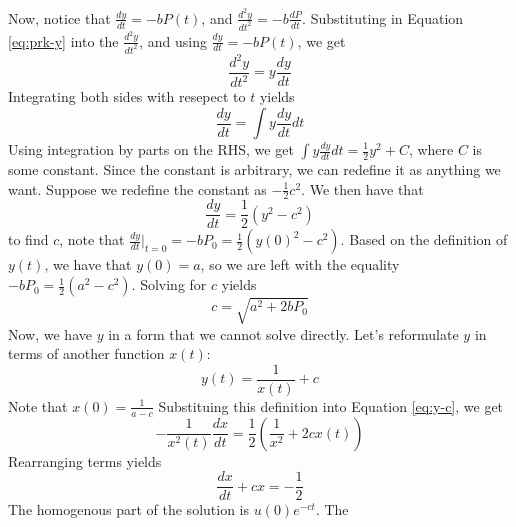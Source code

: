 \documentclass[11pt,addpoints,answers]{exam}
\begin{document}
\begin{questions}
                    Now, notice that $\frac{dy}{dt} =
                    -bP(t)$, and $\frac{d^{2}y}{dt^{2}} = -b \frac{dP}{dt}$.
                    Substituting in Equation \ref{eq:prk-y} into the
                    $\frac{d^{2}y}{dt^{2}}$, and using $\frac{dy}{dt} = -bP(t)$,
                    we get
                    \[
                        \frac{d^{2}y}{dt^{2}} = y \frac{dy}{dt}
                    \]
                    Integrating both sides with resepect to $t$ yields
                    \[
                        \frac{dy}{dt} = \int y \frac{dy}{dt} dt
                    \]
                    Using integration by parts on the RHS, we get $\int y
                    \frac{dy}{dt} dt = \frac{1}{2}y^{2} + C$, where $C$ is some
                    constant. Since the constant is arbitrary, we can redefine
                    it as anything we want. Suppose we redefine the constant as
                    $-\frac{1}{2}c^{2}$. We then have that
                    \begin{equation}
                        \label{eq:y-c}
                        \frac{dy}{dt} = \frac{1}{2}(y^{2} - c^{2})
                    \end{equation}
                    to find $c$, note that $\frac{dy}{dt}\Big|_{t=0} = -bP_0 =
                    \frac{1}{2}(y(0)^{2} - c^{2})$.  Based on the definition of
                    $y(t)$, we have that $y(0) = a$, so we are left with the
                    equality $-bP_0 = \frac{1}{2}(a^{2} - c^{2})$. Solving for
                    $c$ yields
                    \[
                        c = \sqrt{a^{2} + 2bP_0} 
                    \]
                    Now, we have $y$ in a form that we cannot solve directly.
                    Let's reformulate $y$ in terms of another function $x(t)$:
                    \begin{equation}
                        \label{eq:y-x}
                        y(t) = \frac{1}{x(t)} + c
                    \end{equation}
                    Note that $x(0) = \frac{1}{a-c}$
                    Substituing this definition into Equation \ref{eq:y-c}, we
                    get
                    \[
                        -\frac{1}{x^{2}(t)}\frac{dx}{dt} =
                        \frac{1}{2}(\frac{1}{x^{2}} + 2cx(t))
                    \]
                    Rearranging terms yields
                    \[
                        \frac{dx}{dt} + cx = -\frac{1}{2}
                    \]
                    The homogenous part of the solution is $u(0)e^{-ct}$. The

\end{questions}
\end{document}
